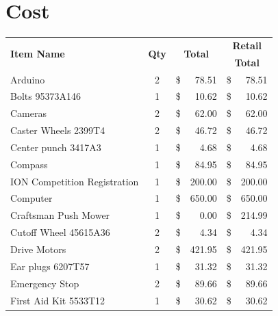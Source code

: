 \documentclass[12pt]{article}%
\begin{document}
\section{Cost}
    \begin{longtable}[p]{l||c|rr|rr}
        \toprule
        \multicolumn{1}{l||}{\multirow{2}{*}{\textbf{Item Name}}} & \multicolumn{1}{c|}{\multirow{2}{*}{\textbf{Qty}}} & \multicolumn{2}{c|}{\multirow{2}{*}{\textbf{Total}}} & \multicolumn{2}{c}{\textbf{Retail}}\\
        \multicolumn{1}{l||}{} & \multicolumn{1}{c|}{} & \multicolumn{2}{c|}{} & \multicolumn{2}{c}{\textbf{Total}}\\
        \midrule
        \endhead
        Arduino                      & 2 & \$ &   78.51 & \$ &   78.51\\
        Bolts 95373A146              & 1 & \$ &   10.62 & \$ &   10.62\\%
        Cameras                      & 2 & \$ &   62.00 & \$ &   62.00\\%
        Caster Wheels 2399T4         & 2 & \$ &   46.72 & \$ &   46.72\\
        Center punch 3417A3          & 1 & \$ &    4.68 & \$ &    4.68\\
        Compass                      & 1 & \$ &   84.95 & \$ &   84.95\\
        ION Competition Registration & 1 & \$ &  200.00 & \$ &  200.00\\
        Computer                     & 1 & \$ &  650.00 & \$ &  650.00\\%
        Craftsman Push Mower         & 1 & \$ &    0.00 & \$ &  214.99\\
        Cutoff Wheel 45615A36        & 2 & \$ &    4.34 & \$ &    4.34\\
        Drive Motors                 & 2 & \$ &  421.95 & \$ &  421.95\\
        Ear plugs 6207T57            & 1 & \$ &   31.32 & \$ &   31.32\\%
        Emergency Stop               & 2 & \$ &   89.66 & \$ &   89.66\\
        First Aid Kit 5533T12        & 1 & \$ &   30.62 & \$ &   30.62\\%

\end{longtable}
\end{document}
